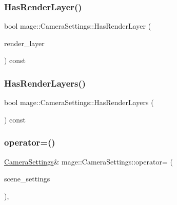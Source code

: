 \hypertarget{classmage_1_1_camera_settings_a5f5f7e1019db2e65cddc1a62ae30efc7}{}\label{classmage_1_1_camera_settings_a5f5f7e1019db2e65cddc1a62ae30efc7} 
\subsubsection{\texorpdfstring{Has\+Render\+Layer()}{HasRenderLayer()}}
{\footnotesize\ttfamily bool mage\+::\+Camera\+Settings\+::\+Has\+Render\+Layer (\begin{DoxyParamCaption}\item[{\hyperlink{namespacemage_a8b4a82582105b0299e2c2be5af7255d6}{Render\+Layer}}]{render\+\_\+layer }\end{DoxyParamCaption}) const\hspace{0.3cm}{\ttfamily [noexcept]}}

\hypertarget{classmage_1_1_camera_settings_a838dfb8f3d32d3d23a7c72719ce182f3}{}\label{classmage_1_1_camera_settings_a838dfb8f3d32d3d23a7c72719ce182f3} 
\subsubsection{\texorpdfstring{Has\+Render\+Layers()}{HasRenderLayers()}}
{\footnotesize\ttfamily bool mage\+::\+Camera\+Settings\+::\+Has\+Render\+Layers (\begin{DoxyParamCaption}{ }\end{DoxyParamCaption}) const\hspace{0.3cm}{\ttfamily [noexcept]}}

\hypertarget{classmage_1_1_camera_settings_aea52aa4b415d5b9a67f03e77a1979f47}{}\label{classmage_1_1_camera_settings_aea52aa4b415d5b9a67f03e77a1979f47} 
\subsubsection{\texorpdfstring{operator=()}{operator=()}\hspace{0.1cm}{\footnotesize\ttfamily [1/2]}}
{\footnotesize\ttfamily \hyperlink{classmage_1_1_camera_settings}{Camera\+Settings}\& mage\+::\+Camera\+Settings\+::operator= (\begin{DoxyParamCaption}\item[{const \hyperlink{classmage_1_1_camera_settings}{Camera\+Settings} \&}]{scene\+\_\+settings }\end{DoxyParamCaption})\hspace{0.3cm}{\ttfamily [default]}, {\ttfamily [noexcept]}}

